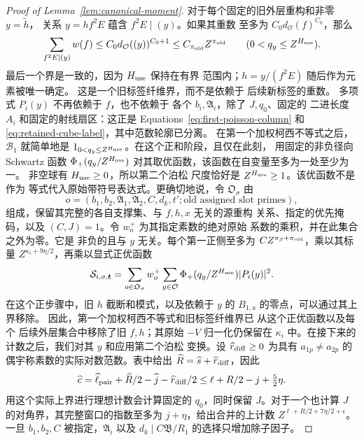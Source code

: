 \documentclass[11pt,a4paper]{article}
\numberwithin{equation}{section}
\numberwithin{figure}{section}
\theoremstyle{definition}
\theoremstyle{remark}
\begin{document}
\begin{proof}[Proof of Lemma~\ref{lem:canonical-moment}]
对于每个固定的旧外层重构和非零 \(y=\widetilde h\)，
关系 \(y=hf^2E\) 蕴含 \(f^2E\mid(y)\)。如果其重数
至多为 \(C_0d_{\mathcal O}(f)^{C_0}\)，那么
\begin{equation}\label{eq:inverse-old-label-fibre}
 \sum_{f^2E\mid(y)}w(f)
 \le C_0d_{\mathcal O}((y))^{C_0+1}
 \le C_{\pi_{\rm old}}Z^{\pi_{\rm old}}
 \qquad(0<q_y\le Z^{H_{\rm use}}).
\end{equation}
最后一个界是一致的，因为 \(H_{\rm use}\) 保持在有界
范围内；\(h=y/(f^2E)\) 随后作为元素被唯一确定。
这是一个旧标签纤维界，而不是依赖于
后续新标签的重数。
多项式 \(P_i(y)\) 不再依赖于 \(f\)，也不依赖于
各个 \(b_i,\mathfrak A_i\)，除了 \(J,q_0\)、固定的
二进长度 \(A_i\) 和固定的射线扇区：这正是
Equations~\eqref{eq:first-poisson-column} 和
\eqref{eq:retained-cube-label}，其中范数轮廓已分离。
在第一个加权柯西不等式之后，\(\mathcal B_1\) 就简单地是
\(1_{0<q_y\le Z^{H_{\rm use}}}\)。在这个正和阶段，且仅在此刻，
用固定的非负径向 Schwartz 函数
\(\Phi_+(q_y/Z^{H_{\rm use}})\) 对其取优函数，该函数在自变量至多为一处至少为一。
非空球有 \(H_{\rm use}\ge0\)，所以第二个泊松
尺度恰好是 \(Z^{H_{\rm use}}\ge1\)。该优函数不是作为
等式代入原始带符号表达式。更确切地说，令
\(\mathfrak O_\sigma\) 由
\[
 o=(b_1,b_2,\mathfrak A_1,\mathfrak A_2,C,d_k,t';
       \text{old assigned slot primes}),
\]
组成，保留其完整的各自支撑集、与 \(f,h,x\) 无关的源重构
关系、指定的优先掩码，以及
\((C,J)=1\)。令 \(w_o^+\) 为其指定素数的绝对原始
系数的乘积，并在此集合之外为零。它是
非负的且与 \(y\) 无关。每个第一正侧至多为
\(C Z^{\pi_\beta+\pi_{\rm old}}\)，乘以其标量
\(Z^{\kappa_i+9\eta/2}\)，再乘以显式正优函数
\begin{equation}\label{eq:inverse-first-majorant}
 \mathcal S_{i,\sigma,\boldsymbol t}
 =\sum_{o\in\mathfrak O_\sigma}w_o^+
    \sum_{y\in\mathcal O}\Phi_+(q_y/Z^{H_{\rm use}})|P_i(y)|^2.
\end{equation}
在这个正步骤中，旧 \(h\) 截断和模式，以及依赖于
\(y\) 的 \(B_{1,a}\) 的零点，可以通过其上界移除。
因此，第一个加权柯西不等式和旧标签纤维界已
从这个正优函数以及每个
后续外层集合中移除了旧 \(f,h\)；其原始 \(-V\) 归一化仍保留在
\(\kappa_i\) 中。在接下来的计数之后，我们对其 \(y\) 和应用第二个泊松
变换。设 \(\widehat r_{\rm diff}\ge0\) 为具有 \(a_{1p}\ne a_{2p}\) 的偶宇称素数的实际对数范数。表中给出
\(\widehat R=\widehat s+\widehat r_{\rm diff}\)，因此
\begin{equation}\label{eq:fixed-cube-count}
 \widehat c=\widehat\ell_{\rm pair}+\widehat R/2-\widehat j
                  -\widehat r_{\rm diff}/2
 \le\ell+R/2-j+\tfrac52\eta.
\end{equation}
用这个实际上界进行理想计数会计算固定的 \(q_0\)，同时保留 \(J\)。对于一个也计算 \(J\) 的对角界，其完整窗口的指数至多为 \(j+\eta\)，给出合并的上计数 \(Z^{\ell+R/2+7\eta/2+\epsilon}\)。一旦 \(b_1,b_2,C\) 被指定，\(\mathfrak A_i\) 以及 \(d_k\mid C\mathfrak B/R_1\) 的选择只增加除子因子。


\end{proof}
\end{document}
